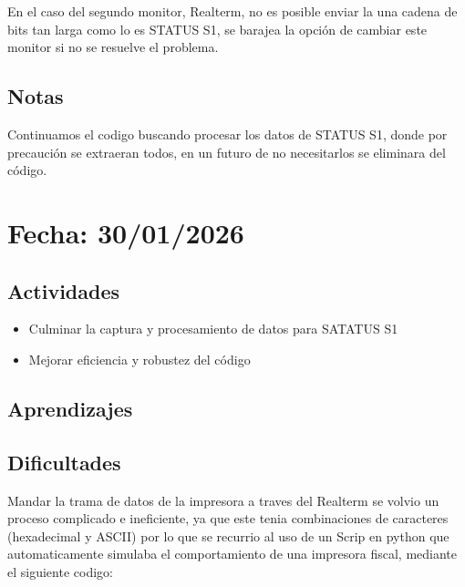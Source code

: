 \documentclass[12pt, a4paper]{article}
\begin{document}
    En el caso del segundo monitor, Realterm, no es posible enviar la una cadena de bits tan larga como lo es STATUS S1, se barajea la opción de cambiar este monitor si no se resuelve el problema.

    \subsection*{Notas}

    Continuamos el codigo buscando procesar los datos de STATUS S1, donde por precaución se extraeran todos, en un futuro de no necesitarlos se eliminara del código.

    \section*{Fecha: 30/01/2026}

    \subsection*{Actividades}

    \begin{itemize}
        \item Culminar la captura y procesamiento de datos para SATATUS S1
        \item Mejorar eficiencia y robustez del código
    \end{itemize}

    \subsection*{Aprendizajes}

    \subsection*{Dificultades}

    Mandar la trama de datos de la impresora a traves del Realterm se volvio un proceso complicado e ineficiente, ya que este tenia combinaciones de caracteres (hexadecimal y ASCII) por lo que se recurrio al uso de un Scrip en python que automaticamente simulaba el comportamiento de una impresora fiscal, mediante el siguiente codigo:
\end{document}
